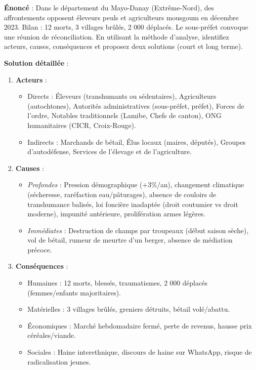 \documentclass[11pt]{article}
\begin{document}
\begin{exoresolu}
\textbf{Énoncé} : Dans le département du Mayo-Danay (Extrême-Nord), des affrontements opposent éleveurs peuls et agriculteurs mousgoum en décembre 2023. Bilan : 12 morts, 3 villages brûlés, 2 000 déplacés. Le sous-préfet convoque une réunion de réconciliation. En utilisant la méthode d'analyse, identifiez acteurs, causes, conséquences et proposez deux solutions (court et long terme).

\textbf{Solution détaillée} :
\begin{enumerate}
    \item \textbf{Acteurs} :
    \begin{itemize}
        \item Directs : Éleveurs (transhumants ou sédentaires), Agriculteurs (autochtones), Autorités administratives (sous-préfet, préfet), Forces de l'ordre, Notables traditionnels (Lamibe, Chefs de canton), ONG humanitaires (CICR, Croix-Rouge).
        \item Indirects : Marchands de bétail, Élus locaux (maires, députés), Groupes d'autodéfense, Services de l'élevage et de l'agriculture.
    \end{itemize}
    \item \textbf{Causes} :
    \begin{itemize}
        \item \textit{Profondes} : Pression démographique (+3\%/an), changement climatique (sécheresse, raréfaction eau/pâturages), absence de couloirs de transhumance balisés, loi foncière inadaptée (droit coutumier vs droit moderne), impunité antérieure, prolifération armes légères.
        \item \textit{Immédiates} : Destruction de champs par troupeaux (début saison sèche), vol de bétail, rumeur de meurtre d'un berger, absence de médiation précoce.
    \end{itemize}
    \item \textbf{Conséquences} :
    \begin{itemize}
        \item Humaines : 12 morts, blessés, traumatismes, 2 000 déplacés (femmes/enfants majoritaires).
        \item Matérielles : 3 villages brûlés, greniers détruits, bétail volé/abattu.
        \item Économiques : Marché hebdomadaire fermé, perte de revenus, hausse prix céréales/viande.
        \item Sociales : Haine interethnique, discours de haine sur WhatsApp, risque de radicalisation jeunes.

\end{itemize}
\end{enumerate}
\end{exoresolu}
\end{document}
